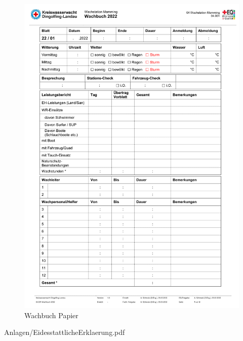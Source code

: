 \documentclass[fontsize=12pt,openright,oneside,paper=a4,BCOR=1cm]{scrbook}
\begin{document}
\begin{appendix}


\begin{figure}[H]
\centering
    \includegraphics[page=2,scale=0.75]{Anlagen/wachbuchPapier.pdf}
  \caption{Wachbuch Papier}
  \label{fig:wachbuchpapier}
\end{figure}


\end{appendix}

	 




    {Anlagen/EidesstattlicheErklaerung.pdf}

\end{document}

